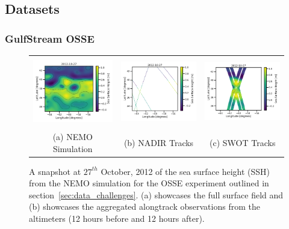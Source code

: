 \subsection{Datasets} \label{sec:datasets}

\subsubsection{GulfStream OSSE}

\begin{figure}[t!]
\small
\begin{center}
\setlength{\tabcolsep}{2pt}
\begin{tabular}{ccc}
\includegraphics[width=4.25cm,height=3cm]{content/figures/maps/ssh/dc20a_nemo_ssh.png} &
\includegraphics[width=4.25cm,height=3cm]{content/figures/maps/ssh/dc20a_nadir4_ssh.png} 
&
\includegraphics[width=4.25cm,height=3cm]{content/figures/maps/ssh/dc20a_swot1_ssh.png} 
\\
(a) NEMO Simulation & (b) NADIR Tracks &
(c) SWOT Tracks
\end{tabular}
\caption{A snapshot at $27^{th}$ October, 2012 of the sea surface height (SSH) from the NEMO simulation for the OSSE experiment outlined in section~\ref{sec:data_challenges}. (a) showcases the full surface field and (b) showcases the aggregated alongtrack observations from the altimeters (12 hours before and 12 hours after).}
\vspace{-5mm}
\label{fig:maps}
\end{center}
\end{figure}

